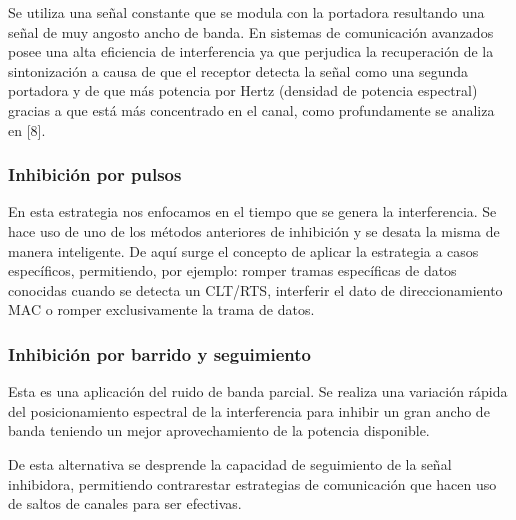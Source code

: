 \documentclass[12pt]{report}
\begin{document}
Se utiliza una señal constante que se modula con la portadora resultando una señal de muy angosto ancho de banda. En sistemas de comunicación 
avanzados posee una alta eficiencia de interferencia ya que perjudica la recuperación de la sintonización a causa de que el receptor detecta 
la señal como una segunda portadora y de que más potencia por Hertz (densidad de potencia espectral) gracias a que está más concentrado
en el canal, como profundamente se analiza en [8].

\subsubsection{Inhibición por pulsos}

En esta estrategia nos enfocamos en el tiempo que se genera la interferencia. Se hace uso de uno de los métodos anteriores de inhibición
y se desata la misma de manera inteligente. De aquí surge el concepto de aplicar la estrategia a casos específicos, permitiendo, por ejemplo:
romper tramas específicas de datos conocidas cuando se detecta un CLT/RTS, interferir el dato de direccionamiento MAC o romper exclusivamente
la trama de datos.

\subsubsection{Inhibición por barrido y seguimiento}

Esta es una aplicación del ruido de banda parcial. Se realiza una variación rápida del posicionamiento espectral de la interferencia para inhibir
un gran ancho de banda teniendo un mejor aprovechamiento de la potencia disponible.\par
De esta alternativa se desprende la capacidad de seguimiento de la señal inhibidora, permitiendo contrarestar estrategias de comunicación que 
hacen uso de saltos de canales para ser efectivas.
\end{document}
